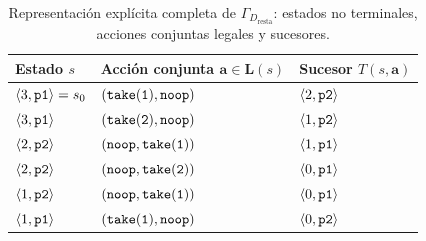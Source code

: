 \begin{table}[htbp]
\centering
\small
\caption{Representación explícita completa de $\Gamma_{D_{\text{resta}}}$: estados no terminales, acciones conjuntas legales y sucesores.}
\label{tab:an_resta_transiciones}
\begin{tabular}{@{}l l l@{}}
\toprule
\textbf{Estado $s$} & \textbf{Acción conjunta $\mathbf a \in \mathbf L(s)$} & \textbf{Sucesor $T(s,\mathbf a)$} \\
\midrule
$\langle 3, \texttt{p1} \rangle = s_0$ & $(\texttt{take}(\texttt{1}), \texttt{noop})$ & $\langle 2, \texttt{p2} \rangle$ \\
$\langle 3, \texttt{p1} \rangle$ & $(\texttt{take}(\texttt{2}), \texttt{noop})$ & $\langle 1, \texttt{p2} \rangle$ \\
$\langle 2, \texttt{p2} \rangle$ & $(\texttt{noop}, \texttt{take}(\texttt{1}))$ & $\langle 1, \texttt{p1} \rangle$ \\
$\langle 2, \texttt{p2} \rangle$ & $(\texttt{noop}, \texttt{take}(\texttt{2}))$ & $\langle 0, \texttt{p1} \rangle$ \\
$\langle 1, \texttt{p2} \rangle$ & $(\texttt{noop}, \texttt{take}(\texttt{1}))$ & $\langle 0, \texttt{p1} \rangle$ \\
$\langle 1, \texttt{p1} \rangle$ & $(\texttt{take}(\texttt{1}), \texttt{noop})$ & $\langle 0, \texttt{p2} \rangle$ \\
\bottomrule
\end{tabular}
\end{table}

